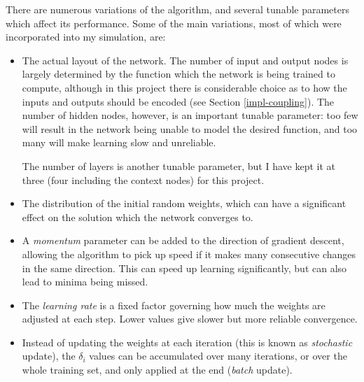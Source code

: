 There are numerous variations of the algorithm, and several tunable
parameters which affect its performance. Some of the main variations,
most of which were incorporated into my simulation, are:

\begin{itemize}

\item The actual layout of the network. The number of input and output
  nodes is largely determined by the function which the network is
  being trained to compute, although in this project there is
  considerable choice as to how the inputs and outputs should be
  encoded (see Section \ref{impl-coupling}). The number of hidden
  nodes, however, is an important tunable parameter: too few will
  result in the network being unable to model the desired function,
  and too many will make learning slow and unreliable.
  
  The number of layers is another tunable parameter, but I have kept
  it at three (four including the context nodes) for this project.
  
\item The distribution of the initial random weights, which can have a
  significant effect on the solution which the network converges to.
  
\item A \emph{momentum} parameter can be added to the direction of
  gradient descent, allowing the algorithm to pick up speed if it
  makes many consecutive changes in the same direction. This can speed
  up learning significantly, but can also lead to minima being missed.
  
\item The \emph{learning rate} is a fixed factor governing how much
  the weights are adjusted at each step. Lower values give slower but
  more reliable convergence.
  
\item Instead of updating the weights at each iteration (this is known
  as \emph{stochastic} update), the $\delta_i$ values can be
  accumulated over many iterations, or over the whole training set,
  and only applied at the end (\emph{batch} update).\label{theory-bp-batch}

\end{itemize}
